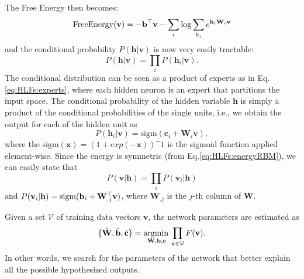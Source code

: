 The Free Energy then becomes: 
\begin{equation}
\text{FreeEnergy}(\mathbf{v})=-\mathbf{b}^\top \mathbf{v} -\sum_i \log \sum_{h_i} e^{\mathbf{h}_i \mathbf{W}_i \mathbf{v}}
\end{equation}
and the conditional probability $P(\mathbf{h}|\mathbf{v})$ is now very easily tractable:
\begin{equation}
P(\mathbf{h}|\mathbf{v})=\prod_i P(\mathbf{h}_i|\mathbf{v}).
\end{equation}
The conditional distribution can be seen as a product of experts as in Eq. \ref{eq:HLFs:experts}, where each hidden neuron is an expert that partitions the input space. The conditional probability of the hidden variable $\mathbf{h}$ is simply a product of the conditional probabilities of the single units, i.e., we obtain the output for each of the hidden unit as  
\begin{equation}
P(\mathbf{h}_i|\mathbf{v})= \text{sigm}(\mathbf{c}_i + \mathbf{W}_i \mathbf{v}),
\end{equation}
where the $\text{sigm}(\mathbf{x})=(1+exp(-\mathbf{x}))^-1$ is the sigmoid function applied element-wise. Since the energy is symmetric (from Eq.\ref{eq:HLFs:energyRBM}), we can easily state that 
\begin{equation}
P(\mathbf{v}|\mathbf{h})=\prod_i P(\mathbf{v}_i|\mathbf{h})
\label{eq:LLFs:generatingx}
\end{equation} and $P(\mathbf{v}_i|\mathbf{h})= \text{sigm}(\mathbf{b}_i + \mathbf{W}^\top_{.j} \mathbf{v})$, where $\mathbf{W}_{.j}$ is the $j$-th column of $\mathbf{W}$. 

Given a set $\mathcal{V}$ of training data vectors $\mathbf{v}$, the network parameters are estimated as 
\begin{equation}
\{\hat{\mathbf{W}}, \hat{\mathbf{b}}, \hat{\mathbf{c}}\} = \underset{\mathbf{W}, \mathbf{b}, \mathbf{c}}{\operatorname{argmin}\,} \prod_{\mathbf{v} \in \mathcal{V}} F(\mathbf{v}).
\label{eq:training}
\end{equation}
In other words, we search for the parameters of the network that better explain all the possible hypothesized outputs.

